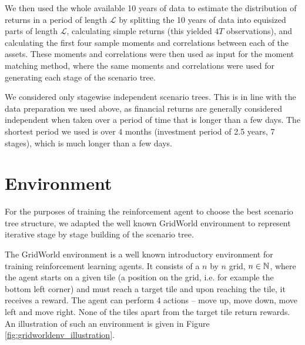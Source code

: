 We then used the whole available 10 years of data to estimate the distribution of returns in a period of length  $\mathcal{L}$ by splitting the 10 years of data into equisized parts of length $\mathcal{L}$, calculating simple returns (this yielded $4T$ observations), and calculating the first four sample moments and correlations between each of the assets. These moments and correlations were then used as input for the moment matching method, where the same moments and correlations were used for generating each stage of the scenario tree.

\begin{rem}
We considered only stagewise independent scenario trees. This is in line with the data preparation we used above, as financial returns are generally considered independent when taken over a period of time that is longer than a few days. The shortest period we used is over $4$ months (investment period of 2.5 years, 7 stages), which is much longer than a few days.
\end{rem}

\section{Environment}
For the purposes of training the reinforcement agent to choose the best scenario tree structure, we adapted the well known GridWorld environment to represent iterative stage by stage building of the scenario tree.
\begin{rem}
The GridWorld environment is a well known introductory environment for training reinforcement learning agents. It consists of a $n$ by $n$ grid, $n \in \mathbb{N}$, where the agent starts on a given tile (a position on the grid, i.e. for example the bottom left corner) and must reach a target tile and upon reaching the tile, it receives a reward. The agent can perform 4 actions -- move up, move down, move left and move right. None of the tiles apart from the target tile return rewards. An illustration of such an environment is given in Figure \ref{fig:gridworldenv_illustration}.
\end{rem}


